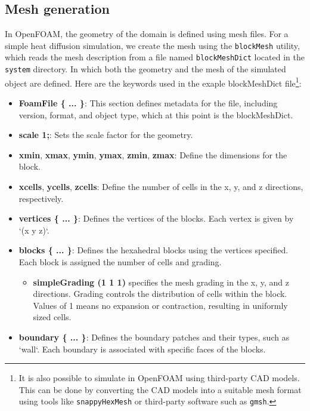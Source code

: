 \documentclass{article}
\begin{document}
\subsection{Mesh generation}
In OpenFOAM, the geometry of the domain is defined using mesh files. For a simple heat diffusion simulation, we create the mesh using the \texttt{blockMesh} utility,
which reads the mesh description from a file named \texttt{blockMeshDict} located in the \texttt{system} directory.
In which both the geometry and the mesh of the simulated object are defined.
Here are the keywords used in the exaple blockMeshDict file\footnote{It is also possible to simulate in OpenFOAM using third-party CAD models.
This can be done by converting the CAD models into a suitable mesh format using tools like \texttt{snappyHexMesh} or third-party software such as \texttt{gmsh}.}:


\begin{itemize}
    \item \textbf{FoamFile \{ ... \}}: This section defines metadata for the file, including version, format, and object type, which at this point is the blockMeshDict.
    \item \textbf{scale 1;}: Sets the scale factor for the geometry.
    \item \textbf{xmin}, \textbf{xmax}, \textbf{ymin}, \textbf{ymax}, \textbf{zmin}, \textbf{zmax}: Define the dimensions for the block.
    \item \textbf{xcells}, \textbf{ycells}, \textbf{zcells}: Define the number of cells in the x, y, and z directions, respectively.
    \item \textbf{vertices \{ ... \}}: Defines the vertices of the blocks. Each vertex is given by `(x y z)`.
    \item \textbf{blocks \{ ... \}}: Defines the hexahedral blocks using the vertices specified. Each block is assigned the number of cells and grading.
    \begin{itemize}
        \item \textbf{simpleGrading (1 1 1)} specifies the mesh grading in the x, y, and z directions. Grading controls the distribution of cells within the block.
        Values of 1 means no expansion or contraction, resulting in uniformly sized cells.
    \end{itemize}
    \item \textbf{boundary \{ ... \}}: Defines the boundary patches and their types, such as `wall`. Each boundary is associated with specific faces of the blocks.
\end{itemize}
\end{document}
